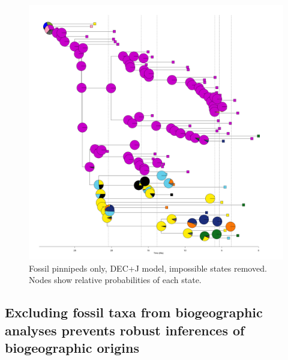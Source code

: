 \documentclass[a4paper, 12pt]{article}
\begin{document}
\begin{figure}[H]
 \centering
  \includegraphics[width = \linewidth]{figures/fossil-pinnipeds-DECj-impossible-pies.png}
  \caption{Fossil pinnipeds only, DEC+J model, impossible states removed. Nodes show relative probabilities of each state.}
  \label{fig-fossil-decj-pie}
\end{figure} 

\subsection{Excluding fossil taxa from biogeographic analyses prevents robust inferences of biogeographic origins}
\end{document}
